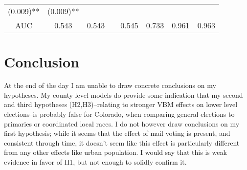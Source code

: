 \documentclass[12pt,twoside]{reedthesis}
\begin{document}
\begin{longtable}[]{@{}cccccccc@{}}
\begin{minipage}[t]{0.09\columnwidth}
  (0.009)**\strut
  \end{minipage} & \begin{minipage}[t]{0.10\columnwidth}\centering\strut
  (0.009)**\strut
  \end{minipage}\tabularnewline
  \begin{minipage}[t]{0.12\columnwidth}\centering\strut
  AUC\strut
  \end{minipage} & \begin{minipage}[t]{0.09\columnwidth}\centering\strut
  0.543\strut
  \end{minipage} & \begin{minipage}[t]{0.09\columnwidth}\centering\strut
  0.543\strut
  \end{minipage} & \begin{minipage}[t]{0.09\columnwidth}\centering\strut
  \strut
  \end{minipage} & \begin{minipage}[t]{0.09\columnwidth}\centering\strut
  0.545\strut
  \end{minipage} & \begin{minipage}[t]{0.09\columnwidth}\centering\strut
  0.733\strut
  \end{minipage} & \begin{minipage}[t]{0.09\columnwidth}\centering\strut
  0.961\strut
  \end{minipage} & \begin{minipage}[t]{0.10\columnwidth}\centering\strut
  0.963\strut
  \end{minipage}\tabularnewline
  \bottomrule
  \end{longtable}
  
  \chapter*{Conclusion}\label{conclusion}
  
  \setcounter{chapter}{5} \setcounter{section}{0}
  
  At the end of the day I am unable to draw concrete conclusions on my
  hypotheses. My county level models do provide some indication that my
  second and third hypotheses (H2,H3)--relating to stronger VBM effects on
  lower level elections--is probably false for Colorado, when comparing
  general elections to primaries or coordinated local races. I do not
  however draw conclusions on my first hypothesis; while it seems that the
  effect of mail voting is present, and consistent through time, it
  doesn't seem like this effect is particularly different from any other
  effects like urban population. I would say that this is weak evidence in
  favor of H1, but not enough to solidly confirm it.
  
\end{document}

